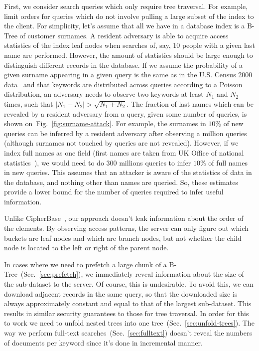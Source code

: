 \documentclass[notitlepage,longbibliography]{revtex4-1}
\newcommand{\figref}[1]{Fig.~\ref{#1}}
\begin{document}
First, we consider search queries which only require tree traversal.
For example, limit orders for queries which do not involve pulling a large subset of the index to the client.
For simplicity, let's assume that all we have in a database index is a B-Tree of customer surnames.
A resident adversary is able to acquire access statistics of the index leaf nodes when searches of, say, $10$ people with a given last name are performed.
However, the amount of statistics should be large enough to distinguish different records in the database.
If we assume the probability of a given surname appearing in a given query is the same as in the U.S. Census 2000 data~\cite{us-census-surnames}
and that keywords are distributed across queries according to a Poisson distribution,
an adversary needs to observe two keywords at least $N_1$ and $N_2$ times, such that $|N_1 - N_2| > \sqrt{N_1 + N_2}$.
The fraction of last names which can be revealed by a resident adversary from a query, given some number of queries, is shown on~\figref{fig:surname-attack}.
For example, the surnames in $10\%$ of new queries can be inferred by a resident adversary after observing a million queries (although surnames not touched by queries are not revealed).
However, if we index full names as one field (first names are taken from UK Office of national statistics~\cite{uk-first-names}),
we would need to do $300$ millions queries to infer $10\%$ of full names in new queries.
This assumes that an attacker is aware of the statistics of data in the database, and nothing other than names are queried.
So, these estimates provide a lower bound for the number of queries required to infer useful information.

Unlike CipherBase~\cite{cipherbase}, our approach doesn't leak information about the order of the elements.
By observing access patterns, the server can only figure out which buckets are leaf nodes and which are branch nodes,
but not whether the child node is located to the left or right of the parent node.

In cases where we need to prefetch a large chunk of a B-Tree~(Sec.~\ref{sec:prefetch}), we immediately reveal information about the size of the sub-dataset to the server.
Of course, this is undesirable.
To avoid this, we can download adjacent records in the same query, so that the downloaded size is always approximately constant and equal to that of the largest sub-dataset.
This results in similar security guarantees to those for tree traversal.
In order for this to work we need to unfold nested trees into one tree~(Sec.~\ref{sec:unfold-trees}).
The way we perform full-text searches~(Sec.~\ref{sec:fulltext}) doesn't reveal the numbers of documents per keyword since it's done in incremental manner.
\end{document}
